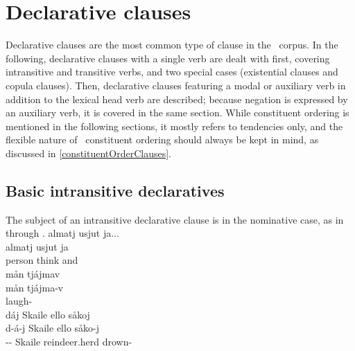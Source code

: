 \section{Declarative clauses}\label{declClauses}
Declarative clauses are the most common type of clause in the \PS\ corpus. In the following, declarative clauses with a single verb are dealt with first, covering intransitive and transitive verbs, and two special cases (existential clauses and copula clauses). Then, declarative clauses featuring a modal or auxiliary verb in addition to the lexical head verb are described; because negation is expressed by an auxiliary verb, it is covered in the same section. While constituent ordering is mentioned in the following sections, it mostly refers to tendencies only, and the flexible nature of \PS\ constituent ordering should always be kept in mind, as discussed in \SEC\ref{constituentOrderClauses}. 

\subsection{Basic intransitive declaratives}\label{basicIntransDeclaratives}
The subject of an intransitive declarative clause is in the nominative case, %
as in  through . 
\ea\label{basicIntransDeclaratives1}
\glll	almatj usjut ja...\\
	almatj usjut ja\\
	person\BS{} think\BS{} and \\%
 
\z
\ea\label{basicIntransDeclaratives2}
\glll	mån tjájmav\\
	mån tjájma-v\\
	 laugh- \\\nopagebreak
{} 
\z
\ea\label{basicIntransDeclaratives3}
\glll	dáj Skaile ello såkoj\\
	d-á-j Skaile ello såko-j\\
	-- Skaile\BS{} reindeer.herd\BS{} drown- \\\nopagebreak
{} 
\z


